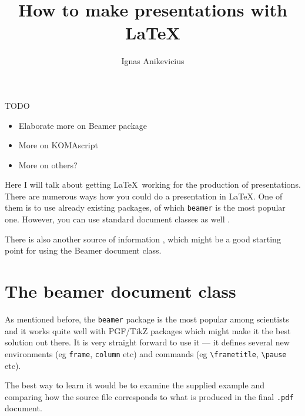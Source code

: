 

\usepackage[]{cite}
\usepackage{framed}

\title{How to make presentations with \LaTeX{}}
\author{Ignas Anikevicius}



\maketitle

\begin{framed}
\begin{center}
{\color{Red} TODO}
\begin{itemize}
    \item Elaborate more on Beamer package
    \item More on KOMAscript
    \item More on others?
\end{itemize}
\end{center}
\end{framed}

Here I will talk about getting \LaTeX\ working for the production of 
presentations. There are numerous ways how you could do a presentation in
\LaTeX{}. One of
them is to use already existing packages, of which \verb|beamer| is the most
popular one. However, you can use standard document classes as well
\cite{PracTeX-komapres}.

There is also another source of information \cite{latexwikibook:presentations},
which might be a good starting point for using the Beamer document class.

\section{The beamer document class}

As mentioned before, the \verb|beamer| package is the most popular among
scientists and it works quite well with PGF/TikZ packages which might make it
the best solution out there. It is very straight forward to use it --- it
defines several new environments (eg \verb|frame|, \verb|column| etc) and
commands (eg \verb|\frametitle|, \verb|\pause| etc).

The best way to learn it would be to examine the supplied example and comparing
how the source file corresponds to what is produced in the final \verb|.pdf|
document.

